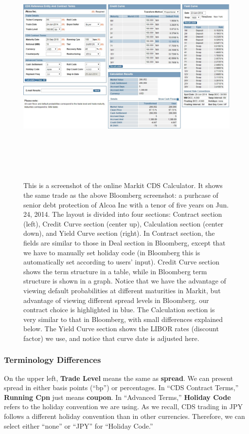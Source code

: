 \documentclass{jss}
\begin{document}
\begin{figure}[H]
\centering
\includegraphics[width=6.3in, height=4.8in]{images/MarkitCDSAlcoa.jpg}
\caption{
This is a screenshot of the online Markit CDS Calculator. It shows the same trade as the above Bloomberg screenshot: a purhcase of senior debt protection of Alcoa Inc with a tenor of five years on Jun. 24, 2014. The layout is divided into four sections: Contract section (left), Credit Curve section (center up), Calculation section (center down), and Yield Curve section (right). In Contract section, the fields are similar to those in Deal section in Bloomberg, except that we have to manually set holiday code (in Bloomberg this is automatically set according to users' input). Credit Curve section shows the term structure in a table, while in Bloomberg term structure is shown in a graph. Notice that we have the advantage of viewing default probabilities at different maturities in Markit, but advantage of viewing different spread levels in Bloomberg. our contract choice is highlighted in blue. The Calculation section is very similar to that in Bloomberg, with small differences explained below. The Yield Curve section shows the LIBOR rates (discount factor) we use, and notice that curve date is adjusted here.
}
\end{figure}

\subsubsection{Terminology Differences}
On the upper left, \textbf{Trade Level} means the same as \textbf{spread}. We can present spread in either basis points (``bp'') or percentages. In ``CDS Contract Terms,'' \textbf{Running Cpn} just means \textbf{coupon}. In ``Advanced Terms,'' \textbf{Holiday Code} refers to the holiday convention we are using. As we recall, CDS trading in JPY follows a different holiday convention than in other currencies. Therefore, we can select either ``none'' or ``JPY'' for ``Holiday Code.''
\end{document}

